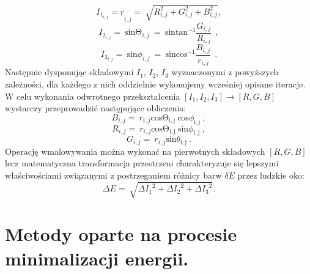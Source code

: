 \documentclass[12pt, twoside, openany]{report}
\theoremstyle{definition}
\begin{document}
\begin{equation}
{I_{1_{i,j}}=r}_{i,j}=\ \sqrt{R^2_{i,j}+G^2_{i,j}+B^2_{i,j}}
\label{TIone}
,
\end{equation}
\begin{equation}
I_{2_{i,j}}=\ {\mathrm{sin} {\mathrm{\Theta }}_{i,j}\ }=\ {\mathrm{sin} {{\mathrm{tan}}^{-1} \frac{G_{i,j}}{R_{i,j}}\ }\ } 
\label{TItwo}
,
\end{equation}
\begin{equation}
I_{3_{i,j}}=\ {\mathrm{sin} {\phi }_{i,j}\ }=\ {\mathrm{sin} {{\mathrm{cos}}^{-1} \frac{B_{i,j}}{r_{i,j}}\ }\ } 
\label{TIthree}
.
\end{equation}
Następnie dysponując składowymi $I_1$, $I_2$, $I_3$ wyznaczonymi z powyższych zależności, dla każdego z nich oddzielnie wykonujemy wcześniej opisane iteracje. W celu wykonania odwrotnego przekształcenia $\left[I_1,I_2,I_3 \right]\to\left[R,G,B\right]$ wystarczy przeprowadzić następujące obliczenia:
\begin{equation}
 B_{i,j}=\ r_{i,j}{\mathrm{cos} {\mathrm{\Theta }}_{\mathrm{i,j}}\ }{\mathrm{cos} {\phi }_{\mathrm{i,j}}\ }
\label{TInvIone}
,
\end{equation}
\begin{equation}
R_{i,j}=\ r_{i,j}{\mathrm{cos} {\mathrm{\Theta }}_{\mathrm{i,j}}\ }{\mathrm{sin} {\phi }_{\mathrm{i,j}}\ }
\label{TInvItwo},
\end{equation}
\begin{equation}
G_{i,j}=\ r_{i,j}{\mathrm{sin} {\theta }_{\mathrm{i,j}}\ } 
\label{TInvIthree}
.
\end{equation}
Operację wmalowywania można wykonać na pierwotnych składowych $[R,G,B]$ lecz matematyczna transformacja przestrzeni charakteryzuje się lepszymi właściwościami związanymi z postrzeganiem różnicy barw $\delta E$ przez ludzkie oko:
\begin{equation}
\Delta E=\ \sqrt{{\Delta I_1}^2+{\Delta I_2}^2+{\Delta I_3}^2}
\label{deltaE}
.
\end{equation}
\chapter{Metody oparte na procesie minimalizacji energii.}
\end{document}
